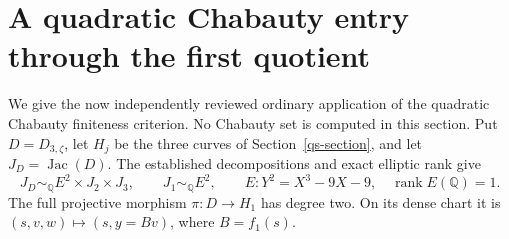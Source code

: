 \section{A quadratic Chabauty entry through the first quotient}
\label{qh-section}

We give the now independently reviewed ordinary application of the
quadratic Chabauty finiteness criterion. No Chabauty set is computed in
this section. Put \(D=D_{3,\zeta}\), let \(H_j\) be the three curves of
Section~\ref{qs-section}, and let \(J_D=\operatorname{Jac}(D)\).
The established decompositions and exact elliptic rank give
\[
 J_D\sim_{\mathbb Q} E^2\times J_2\times J_3,
 \qquad J_1\sim_{\mathbb Q}E^2,
 \qquad E:Y^2=X^3-9X-9,\quad\operatorname{rank}E(\mathbb Q)=1.
\]
The full projective morphism \(\pi:D\to H_1\) has degree two. On its
dense chart it is \((s,v,w)\mapsto(s,y=Bv)\), where \(B=f_1(s)\).

